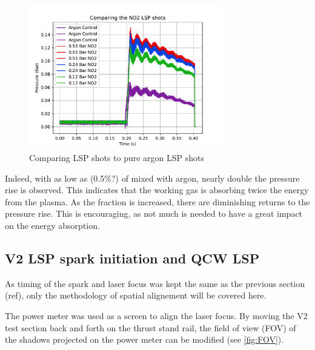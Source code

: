             \begin{figure}[!ht]
                \centering
                \includegraphics[width=0.75\textwidth]{assets/4 experiments/NO2_shots_analysis.pdf}
                \caption{Comparing  LSP shots to pure argon LSP shots}
                \label{fig:NO2_shots_analysis}
            \end{figure}

            Indeed, with as low as (0.5\%?) of  mixed with argon, nearly double the pressure rise is observed. This indicates that the working gas is absorbing twice the energy from the plasma. As the  fraction is increased, there are diminishing returns to the pressure rise. This is encouraging, as not much  is needed to have a great impact on the energy absorption.

        

        \subsection{V2 LSP spark initiation and QCW LSP}


            As timing of the spark and laser focus was kept the same as the previous section (ref), only the methodology of spatial alignement will be covered here.


            The power meter was used as a screen to align the laser focus. By moving the V2 test section back and forth on the thrust stand rail, the field of view (FOV) of the shadows projected on the power meter can be modified (see \autoref{fig:FOV}). 
            
